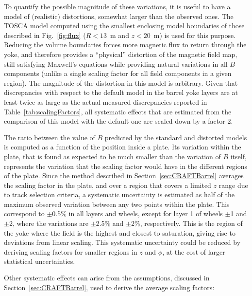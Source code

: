 To quantify the possible magnitude of these variations, it is
useful to have a model of (realistic) distortions, somewhat larger
than the observed ones.
The TOSCA model computed using the smallest enclosing model boundaries of
those described in Fig.~\ref{fig:flux} ($R<13$~m and $z<20$~m) is
used for this purpose.
Reducing the volume boundaries forces more magnetic flux to return through
the yoke, and therefore provides a ``physical'' distortion of the
magnetic field map, still satisfying Maxwell's equations while
providing natural variations in all $B$ components
(unlike a single scaling factor for all field components in a given
region).
The magnitude of the distortion in this model is arbitrary. Given that
discrepancies with respect to the default model in the barrel yoke
layers are at least twice as large as the actual measured discrepancies
reported in Table~\ref{tab:scalingFactors}, all systematic effects
that are estimated from the comparison of this model with the default
one are scaled down by a factor 2.

The ratio between the value of $B$ predicted by the standard and distorted
models is computed as a function of the position inside a plate.
Its variation within the plate, that is found as expected to be much
smaller than the variation of $B$ itself, represents the variation
that the scaling factor would have in the different regions of the plate.
Since the method described in Section~\ref{sec:CRAFTBarrel} averages the
scaling factor in the plate, and over a region
that covers a limited $z$ range due to track selection criteria,
a systematic uncertainty is estimated as half of the maximum
observed variation between any two points within the
plate. This correspond to $\pm$0.5\%  in all layers and wheels,
except for layer 1 of wheels $\pm$1 and $\pm$2, where the
variations are $\pm$2.5\% and $\pm$2\%, respectively. This is the region
of the yoke where the field is the highest and closest to saturation,
giving rise to deviations from linear scaling.
This systematic uncertainty could be reduced by deriving
scaling factors for smaller regions in $z$ and $\phi$, at the cost of larger
statistical uncertainties.

Other systematic effects can arise from the assumptions, discussed in
Section~\ref{sec:CRAFTBarrel}, used to derive the
average scaling factors:

